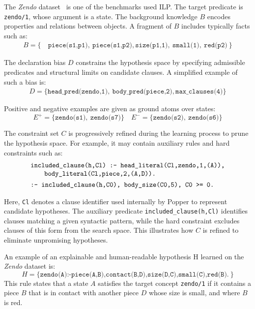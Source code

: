 \begin{example}
The \textit{Zendo} dataset~\cite{bramley2018grounding} is one of the benchmarks used ILP. 
%
The target predicate is \texttt{zendo/1}, whose argument is a state. The background knowledge $B$ encodes properties and relations between objects. A fragment of $B$ includes typically facts such as:
\[
\begin{aligned}
B = \{\ & \texttt{piece(s1,p1)},\ \texttt{piece(s1,p2)}, \texttt{size(p1,1)},\ \texttt{small(1)},\ \texttt{red(p2)}\ \}
\end{aligned}
\]

\noindent
The declaration bias $D$ constrains the hypothesis space by specifying admissible predicates and structural limits on candidate clauses. A simplified example of such a bias is:
\[
\begin{aligned}
D = \{ \texttt{head\_pred(zendo,1)},\ \texttt{body\_pred(piece,2)},  \texttt{max\_clauses(4)}\}
\end{aligned}
\]

\noindent
Positive and negative examples are given as ground atoms over states:
\[
E^+ = \{\texttt{zendo(s1)},\ \texttt{zendo(s7)}\}
\quad
E^- = \{\texttt{zendo(s2)},\ \texttt{zendo(s6)}\}
\]

\noindent
The constraint set $C$ is progressively refined during the learning process to prune the hypothesis space. For example, it may contain auxiliary rules and hard constraints such as:
\[
\begin{array}{@{}l@{}}
\texttt{included\_clause(h,Cl) :- head\_literal(Cl,zendo,1,(A)),} \\
\qquad \texttt{body\_literal(Cl,piece,2,(A,D)).} \\[0.4em]
\texttt{:- included\_clause(h,C0), body\_size(C0,5), C0 >= 0.}
\end{array}
\]

\noindent
Here, \texttt{Cl} denotes a clause identifier used internally by Popper to represent candidate hypotheses. The auxiliary predicate \texttt{included\_clause(h,Cl)} identifies clauses matching a given syntactic pattern, while the hard constraint excludes clauses of this form from the search space. This illustrates how $C$ is refined to eliminate unpromising hypotheses.

\noindent
An example of an explainable and human-readable hypothesis H learned on the \textit{Zendo} dataset is:
\[
H = \{
\texttt{zendo(A):-piece(A,B),contact(B,D),size(D,C),small(C),red(B).}\ \}
\]
\noindent
This rule states that a state $A$ satisfies the target concept \texttt{zendo/1} if it contains a piece $B$ that is in contact with another piece $D$ whose size is small, and where $B$ is red.
\end{example}

